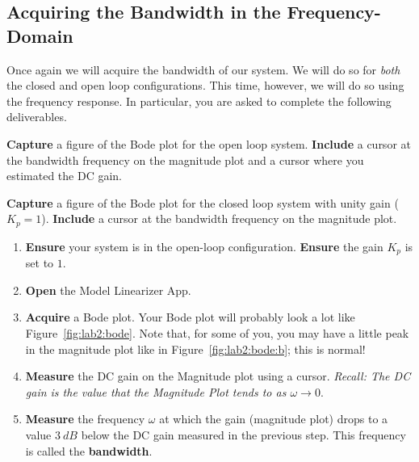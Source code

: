 \subsection{Acquiring the Bandwidth in the Frequency-Domain}
Once again we will acquire the bandwidth of our system. We will do so for
\emph{both} the closed and open loop configurations. This time, however,
we will do so using the frequency response. In particular, you are asked
to complete the following deliverables.
%
\begin{deliverable}[label={lab2:d3a}]
  \textbf{Capture} a figure of the Bode plot for the open loop system.
  \textbf{Include} a cursor at the bandwidth frequency on the magnitude
  plot and a cursor where you estimated the DC gain.
\end{deliverable}
%
\begin{deliverable}[label={lab2:d3}]
  \textbf{Capture} a figure of the Bode plot for the closed loop system
  with unity gain (\(K_p = 1\)).
  \textbf{Include} a cursor at the bandwidth frequency on the magnitude
  plot.
\end{deliverable}
%
\begin{procedure}[label={proc:lab2:p3}]
  \begin{enumerate}[label=(\arabic*)]
    \item{
      \textbf{Ensure} your system is in the open-loop configuration.
      \textbf{Ensure} the gain \(K_p\) is set to \(1.\)
    }
    \item{
      \textbf{Open} the Model Linearizer App.
    }
    \item{
      \textbf{Acquire} a Bode plot. Your Bode plot will probably look a lot
      like Figure~\ref{fig:lab2:bode}. Note that, for some of you, you may
      have a little peak in the magnitude plot like in
      Figure~\ref{fig:lab2:bode:b}; this is normal!
      \label{proc:lab2:p3:3}
    }
    \item{
      \textbf{Measure} the DC gain on the Magnitude plot using a cursor.
      \emph{Recall: The DC gain is the value that the Magnitude Plot tends to
      as \(\omega \to 0.\)}
    }
    \item{
      \textbf{Measure} the frequency \(\omega\) at which the gain
      (magnitude plot) drops to a value \(\SI{3}{dB}\)
      below the DC gain measured in the previous step. This frequency
      is called the \textbf{bandwidth}.
      \label{proc:lab2:p3:5}
    }
  \end{enumerate}
\end{procedure}
%
